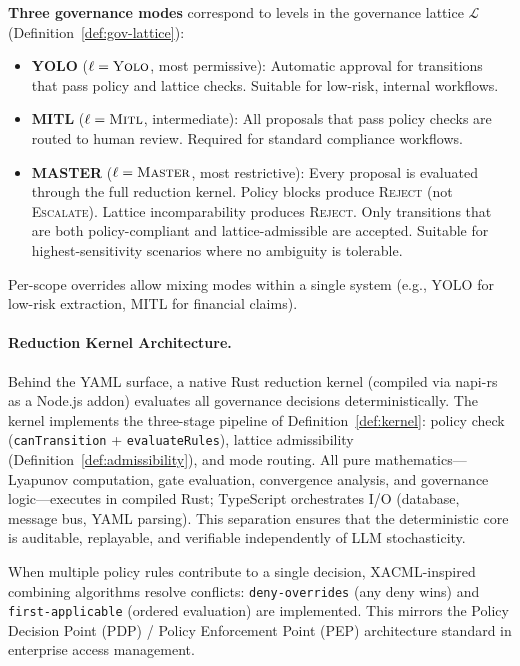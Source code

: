\documentclass[11pt]{article}
\begin{document}
\textbf{Three governance modes} correspond to levels in the governance lattice $\mathcal{L}$ (Definition~\ref{def:gov-lattice}):

\begin{itemize}
  \item \textbf{YOLO} ($\ell = \textsc{Yolo}$, most permissive): Automatic approval for transitions that pass policy and lattice checks. Suitable for low-risk, internal workflows.
  \item \textbf{MITL} ($\ell = \textsc{Mitl}$, intermediate): All proposals that pass policy checks are routed to human review. Required for standard compliance workflows.
  \item \textbf{MASTER} ($\ell = \textsc{Master}$, most restrictive): Every proposal is evaluated through the full reduction kernel. Policy blocks produce \textsc{Reject} (not \textsc{Escalate}). Lattice incomparability produces \textsc{Reject}. Only transitions that are both policy-compliant and lattice-admissible are accepted. Suitable for highest-sensitivity scenarios where no ambiguity is tolerable.
\end{itemize}

Per-scope overrides allow mixing modes within a single system (e.g., YOLO for low-risk extraction, MITL for financial claims).

\paragraph{Reduction Kernel Architecture.}
Behind the YAML surface, a native Rust reduction kernel (compiled via napi-rs as a Node.js addon) evaluates all governance decisions deterministically. The kernel implements the three-stage pipeline of Definition~\ref{def:kernel}: policy check (\texttt{canTransition} + \texttt{evaluateRules}), lattice admissibility (Definition~\ref{def:admissibility}), and mode routing. All pure mathematics---Lyapunov computation, gate evaluation, convergence analysis, and governance logic---executes in compiled Rust; TypeScript orchestrates I/O (database, message bus, YAML parsing). This separation ensures that the deterministic core is auditable, replayable, and verifiable independently of LLM stochasticity.

When multiple policy rules contribute to a single decision, XACML-inspired combining algorithms \cite{xacml2013} resolve conflicts: \texttt{deny-overrides} (any deny wins) and \texttt{first-applicable} (ordered evaluation) are implemented. This mirrors the Policy Decision Point (PDP) / Policy Enforcement Point (PEP) architecture standard in enterprise access management.
\end{document}
